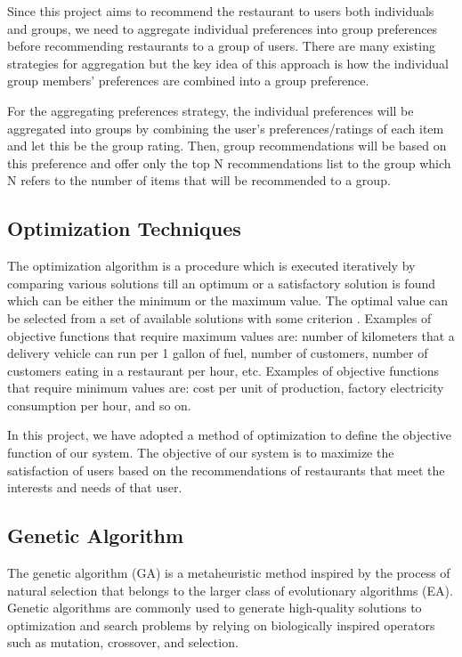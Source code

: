 \documentclass[12pt,oneside,openright,a4paper]{cpe-english-project}
\begin{document}
Since this project aims to recommend the restaurant to users both individuals and groups, we need to aggregate individual preferences into group preferences before recommending restaurants to a group of users. There are many existing strategies for aggregation but the key idea of this approach is how the individual group members’ preferences are combined into a group preference.

For the aggregating preferences strategy, the individual preferences will be aggregated into groups by combining the user’s preferences/ratings of each item and let this be the group rating. Then, group recommendations will be based on this preference and offer only the top N recommendations list to the group which N refers to the number of items that will be recommended to a group.

\subsection{Optimization Techniques}

The optimization algorithm is a procedure which is executed iteratively by comparing various solutions till an optimum or a satisfactory solution is found \cite{AlgorithmsforDiscreteOptimization} which can be either the minimum or the maximum value. The optimal value can be selected from a set of available solutions with some criterion \cite{Mathematicaloptimization}. Examples of objective functions that require maximum values ​​are: number of kilometers that a delivery vehicle can run per 1 gallon of fuel, number of customers, number of customers eating in a restaurant per hour, etc. Examples of objective functions that require minimum values ​​are: cost per unit of production, factory electricity consumption per hour, and so on.

In this project, we have adopted a method of optimization to define the objective function of our system. The objective of our system is to maximize the satisfaction of users based on the recommendations of restaurants that meet the interests and needs of that user.

\subsection{Genetic Algorithm}

The genetic algorithm (GA) is a metaheuristic method inspired by the process of natural selection that belongs to the larger class of evolutionary algorithms (EA). Genetic algorithms are commonly used to generate high-quality solutions to optimization and search problems by relying on biologically inspired operators such as mutation, crossover, and selection. \cite{Geneticalgorithm}
\end{document}
